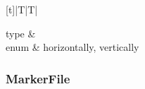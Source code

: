 \documentclass[letterpaper,10pt,english,openany,oneside]{sphinxmanual}
\begin{document}
\begin{savenotes}\sphinxattablestart
\centering
\begin{tabulary}{\linewidth}[t]{|T|T|}
\hline

\sphinxAtStartPar
type
&
\sphinxAtStartPar
{}
\\
\hline
\sphinxAtStartPar
enum
&
\sphinxAtStartPar
horizontally, vertically
\\
\hline
\end{tabulary}
\par
\sphinxattableend\end{savenotes}


\subsubsection{MarkerFile}
\label{\detokenize{docs/advanced/tmap:markerfile}}\label{\detokenize{docs/advanced/tmap:markerfile}}
\end{document}
